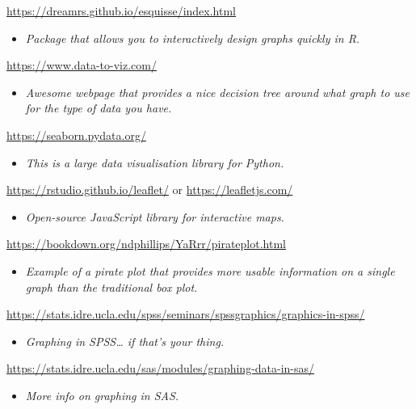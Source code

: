 \documentclass[
]{book}
\providecommand{\tightlist}{%
  \setlength{\itemsep}{0pt}\setlength{\parskip}{0pt}}
\begin{document}
\url{https://dreamrs.github.io/esquisse/index.html}

\begin{itemize}
\tightlist
\item
  \emph{Package that allows you to interactively design graphs quickly in R.}
\end{itemize}

\url{https://www.data-to-viz.com/}

\begin{itemize}
\tightlist
\item
  \emph{Awesome webpage that provides a nice decision tree around what graph to use for the type of data you have.}
\end{itemize}

\url{https://seaborn.pydata.org/}

\begin{itemize}
\tightlist
\item
  \emph{This is a large data visualisation library for Python.}
\end{itemize}

\url{https://rstudio.github.io/leaflet/} or \url{https://leafletjs.com/}

\begin{itemize}
\tightlist
\item
  \emph{Open-source JavaScript library for interactive maps.}
\end{itemize}

\url{https://bookdown.org/ndphillips/YaRrr/pirateplot.html}

\begin{itemize}
\tightlist
\item
  \emph{Example of a pirate plot that provides more usable information on a single graph than the traditional box plot.}
\end{itemize}

\url{https://stats.idre.ucla.edu/spss/seminars/spssgraphics/graphics-in-spss/}

\begin{itemize}
\tightlist
\item
  \emph{Graphing in SPSS\ldots{} if that's your thing.}
\end{itemize}

\url{https://stats.idre.ucla.edu/sas/modules/graphing-data-in-sas/}

\begin{itemize}
\tightlist
\item
  \emph{More info on graphing in SAS.}
\end{itemize}
\end{document}
